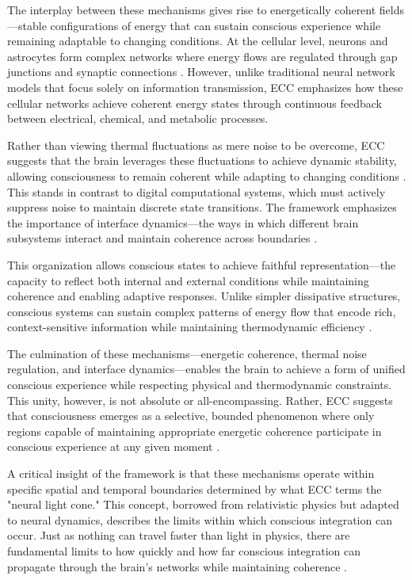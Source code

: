 \begin{refsection}
The interplay between these mechanisms gives rise to energetically coherent fields—stable configurations of energy that can sustain conscious experience while remaining adaptable to changing conditions. At the cellular level, neurons and astrocytes form complex networks where energy flows are regulated through gap junctions and synaptic connections \cite{vasile2017human}. However, unlike traditional neural network models that focus solely on information transmission, ECC emphasizes how these cellular networks achieve coherent energy states through continuous feedback between electrical, chemical, and metabolic processes.

Rather than viewing thermal fluctuations as mere noise to be overcome, ECC suggests that the brain leverages these fluctuations to achieve dynamic stability, allowing consciousness to remain coherent while adapting to changing conditions \cite{singer2018neuronal}. This stands in contrast to digital computational systems, which must actively suppress noise to maintain discrete state transitions. The framework emphasizes the importance of interface dynamics—the ways in which different brain subsystems interact and maintain coherence across boundaries \cite{sporns2011networks}.

This organization allows conscious states to achieve faithful representation—the capacity to reflect both internal and external conditions while maintaining coherence and enabling adaptive responses. Unlike simpler dissipative structures, conscious systems can sustain complex patterns of energy flow that encode rich, context-sensitive information while maintaining thermodynamic efficiency \cite{fries2015rhythms}.

The culmination of these mechanisms—energetic coherence, thermal noise regulation, and interface dynamics—enables the brain to achieve a form of unified conscious experience while respecting physical and thermodynamic constraints. This unity, however, is not absolute or all-encompassing. Rather, ECC suggests that consciousness emerges as a selective, bounded phenomenon where only regions capable of maintaining appropriate energetic coherence participate in conscious experience at any given moment \cite{tononi2015consciousness2dup}.

A critical insight of the framework is that these mechanisms operate within specific spatial and temporal boundaries determined by what ECC terms the "neural light cone." This concept, borrowed from relativistic physics but adapted to neural dynamics, describes the limits within which conscious integration can occur. Just as nothing can travel faster than light in physics, there are fundamental limits to how quickly and how far conscious integration can propagate through the brain's networks while maintaining coherence \cite{von2010dynamic}.


\end{refsection}
